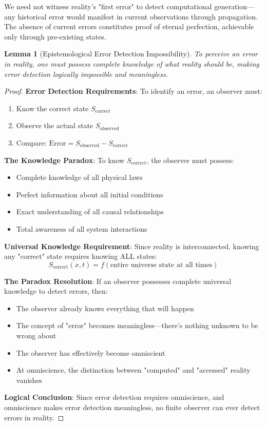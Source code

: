 \documentclass[12pt,a4paper]{article}
\newtheorem{lemma}[theorem]{Lemma}
\begin{document}
\begin{remark}
We need not witness reality's "first error" to detect computational generation—any historical error would manifest in current observations through propagation. The absence of current errors constitutes proof of eternal perfection, achievable only through pre-existing states.
\end{remark}

\begin{lemma}[Epistemological Error Detection Impossibility]
To perceive an error in reality, one must possess complete knowledge of what reality should be, making error detection logically impossible and meaningless.
\end{lemma}

\begin{proof}
\textbf{Error Detection Requirements}: To identify an error, an observer must:
\begin{enumerate}
    \item Know the correct state $S_{\text{correct}}$
    \item Observe the actual state $S_{\text{observed}}$
    \item Compare: $\text{Error} = S_{\text{observed}} - S_{\text{correct}}$
\end{enumerate}

\textbf{The Knowledge Paradox}: To know $S_{\text{correct}}$, the observer must possess:
\begin{itemize}
    \item Complete knowledge of all physical laws
    \item Perfect information about all initial conditions
    \item Exact understanding of all causal relationships
    \item Total awareness of all system interactions
\end{itemize}

\textbf{Universal Knowledge Requirement}: Since reality is interconnected, knowing any "correct" state requires knowing ALL states:
$$S_{\text{correct}}(x,t) = f(\text{entire universe state at all times})$$

\textbf{The Paradox Resolution}: If an observer possesses complete universal knowledge to detect errors, then:
\begin{itemize}
    \item The observer already knows everything that will happen
    \item The concept of "error" becomes meaningless—there's nothing unknown to be wrong about
    \item The observer has effectively become omniscient
    \item At omniscience, the distinction between "computed" and "accessed" reality vanishes
\end{itemize}

\textbf{Logical Conclusion}: Since error detection requires omniscience, and omniscience makes error detection meaningless, no finite observer can ever detect errors in reality.
\end{proof}
\end{document}
